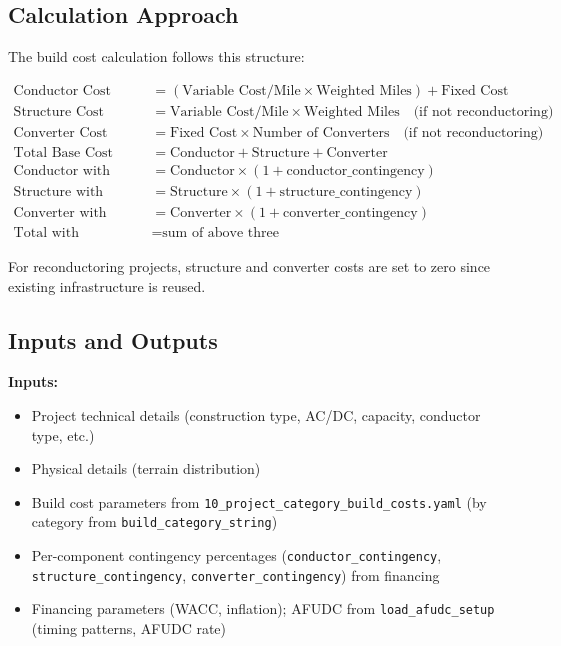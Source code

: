 \documentclass[ctcc_full_documentation.tex]{subfiles}
\begin{document}
\subsection{Calculation Approach}

The build cost calculation follows this structure:

\begin{align}
\text{Conductor Cost} &= (\text{Variable Cost/Mile} \times \text{Weighted Miles}) + \text{Fixed Cost} \\
\text{Structure Cost} &= \text{Variable Cost/Mile} \times \text{Weighted Miles} \quad \text{(if not reconductoring)} \\
\text{Converter Cost} &= \text{Fixed Cost} \times \text{Number of Converters} \quad \text{(if not reconductoring)} \\
\text{Total Base Cost} &= \text{Conductor} + \text{Structure} + \text{Converter} \\
\text{Conductor with Conting.} &= \text{Conductor} \times (1 + \text{conductor\_contingency}) \\
\text{Structure with Conting.} &= \text{Structure} \times (1 + \text{structure\_contingency}) \\
\text{Converter with Conting.} &= \text{Converter} \times (1 + \text{converter\_contingency}) \\
\text{Total with Contingencies} &= \text{sum of above three}
\end{align}

For reconductoring projects, structure and converter costs are set to zero since existing infrastructure is reused.

\subsection{Inputs and Outputs}

\textbf{Inputs:}
\begin{itemize}
    \item Project technical details (construction type, AC/DC, capacity, conductor type, etc.)
    \item Physical details (terrain distribution)
    \item Build cost parameters from \texttt{10\_project\_category\_build\_costs.yaml} (by category from \texttt{build\_category\_string})
    \item Per-component contingency percentages (\texttt{conductor\_contingency}, \texttt{structure\_contingency}, \texttt{converter\_contingency}) from financing
    \item Financing parameters (WACC, inflation); AFUDC from \texttt{load\_afudc\_setup} (timing patterns, AFUDC rate)
\end{itemize}
\end{document}
